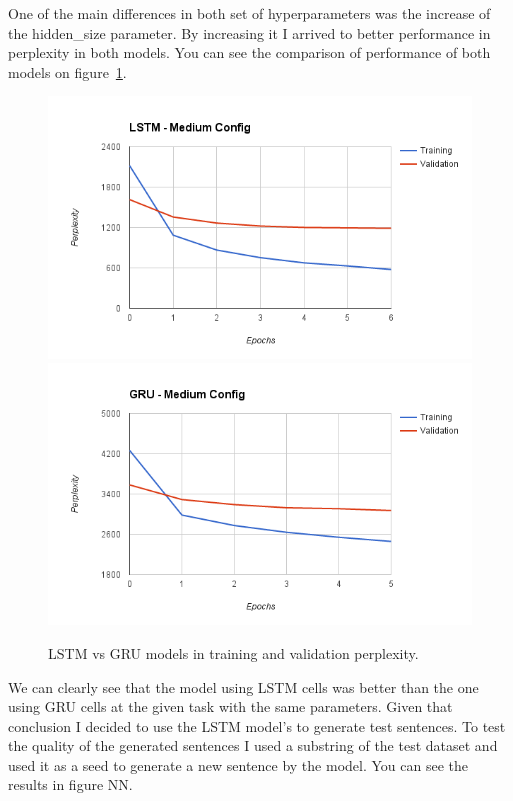 \documentclass{article} %
\begin{document}
One of the main differences in both set of hyperparameters was the increase of
the hidden\_size parameter. By increasing it I arrived to better performance in
perplexity in both models. You can see the comparison of performance of both
models on figure~\ref{fig:perplexity}.

\begin{figure}[h]
\centering
\includegraphics[scale=0.5]{lstm_medium_config}
\includegraphics[scale=0.5]{gru_medium_config}
\caption{LSTM vs GRU models in training and validation perplexity.}
\label{fig:perplexity}
\end{figure}

We can clearly see that the model using LSTM cells was better than the one using
GRU cells at the given task with the same parameters. Given that conclusion I
decided to use the LSTM model's to generate test sentences. To test the quality
of the generated sentences I used a substring of the test dataset and used it as
a seed to generate a new sentence by the model. You can see the results in
figure NN.
\end{document}
